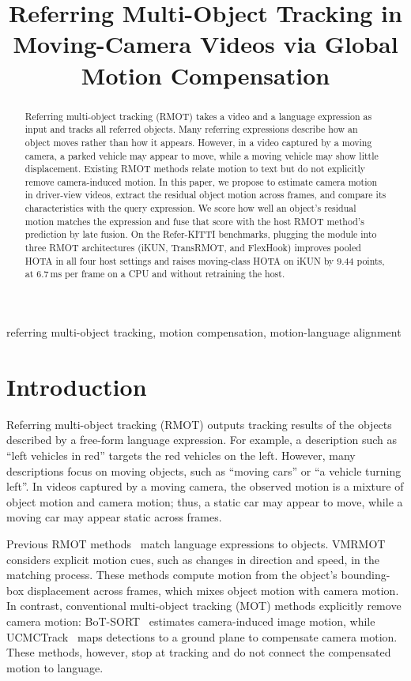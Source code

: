 \documentclass{article}
\title{Referring Multi-Object Tracking in Moving-Camera Videos via Global Motion Compensation}
\begin{document}
\ninept
%
\maketitle
%
\begin{abstract}
  Referring multi-object tracking (RMOT) takes a video and a language expression as input and tracks all referred objects. Many referring expressions describe how an object moves rather than how it appears. However, in a video captured by a moving camera, a parked vehicle may appear to move, while a moving vehicle may show little displacement. Existing RMOT methods relate motion to text but do not explicitly remove camera-induced motion. In this paper, we propose to estimate camera motion in driver-view videos, extract the residual object motion across frames, and compare its characteristics with the query expression. We score how well an object's residual motion matches the expression and fuse that score with the host RMOT method's prediction by late fusion. On the Refer-KITTI benchmarks, plugging the module into three RMOT architectures (iKUN, TransRMOT, and FlexHook) improves pooled HOTA in all four host settings and raises moving-class HOTA on iKUN by $9.44$ points, at $6.7$\,ms per frame on a CPU and without retraining the host.
\end{abstract}
%
\begin{keywords}
  referring multi-object tracking, motion compensation, motion-language alignment
\end{keywords}


\section{Introduction}
\label{sec:intro}
Referring multi-object tracking (RMOT) outputs tracking results of the objects described by a free-form language expression. For example, a description such as \enquote{left vehicles in red} targets the red vehicles on the left. However, many descriptions focus on moving objects, such as \enquote{moving cars} or \enquote{a vehicle turning left}. In videos captured by a moving camera, the observed motion is a mixture of object motion and camera motion; thus, a static car may appear to move, while a moving car may appear static across frames.

Previous RMOT methods~\cite{transrmot,ikun,flexhook} match language expressions to objects. VMRMOT~\cite{vmrmot} considers explicit motion cues, such as changes in direction and speed, in the matching process. These methods compute motion from the object's bounding-box displacement across frames, which mixes object motion with camera motion. In contrast, conventional multi-object tracking (MOT) methods explicitly remove camera motion: BoT-SORT~\cite{botsort} estimates camera-induced image motion, while UCMCTrack~\cite{ucmctrack} maps detections to a ground plane to compensate camera motion. These methods, however, stop at tracking and do not connect the compensated motion to language.
\end{document}
